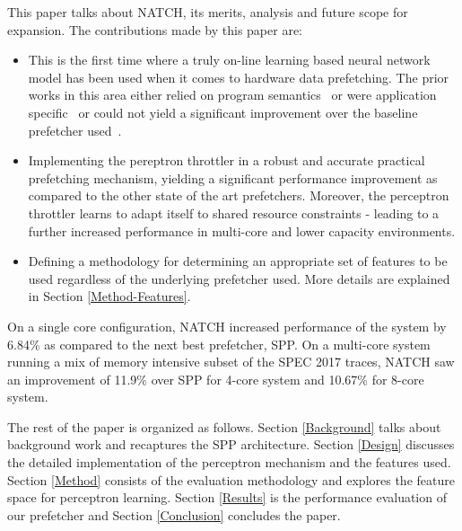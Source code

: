 \vspace{1ex}This paper talks about NATCH, its merits, analysis and
future scope for expansion.  The contributions made by this paper are:

\begin{itemize}
\item This is the first time where a truly on-line learning based
  neural network model has been used when it comes to hardware data
  prefetching.  The prior works in this area either relied on program
  semantics~\cite{Semantics} or were application
  specific~\cite{Datacenter} or could not yield a significant
  improvement over the baseline prefetcher used~\cite{BadPerc}.

\item Implementing the pereptron throttler in a robust and accurate
  practical prefetching mechanism, yielding a significant performance 
  improvement as compared to the other state of the art
  prefetchers.  Moreover, the perceptron throttler learns to adapt
  itself to shared resource constraints - leading to a further increased
  performance in multi-core and lower capacity environments.

\item Defining a methodology for determining an appropriate set of 
  features to be used regardless of the underlying prefetcher used.
  More details are explained in Section \ref{Method-Features}.

\end{itemize}

On a single core configuration, NATCH increased
performance of the system by 6.84\% as compared to the 
next best prefetcher, SPP.  On a multi-core
system running a mix of memory intensive subset of the SPEC 2017
traces, NATCH saw an improvement of 11.9\% over SPP for 4-core
system and 10.67\% for 8-core system.

The rest of the paper is organized as follows.  Section \ref{Background} talks about
background work and recaptures the SPP architecture.  Section \ref{Design}
discusses the detailed implementation of the perceptron mechanism and
the features used.  Section \ref{Method} consists of the evaluation methodology
and explores the feature space for perceptron learning.  Section \ref{Results} is
the performance evaluation of our prefetcher and Section \ref{Conclusion} concludes
the paper.
